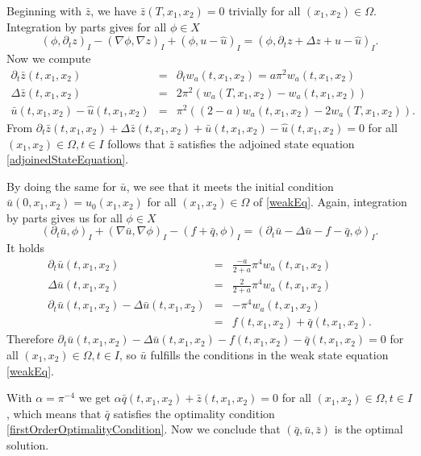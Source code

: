 Beginning with $\bar{z}$, we have $\bar{z}(T, x_1, x_2)=0$ trivially for all $(x_1,x_2)\in\Omega$. Integration by parts gives for all $\phi\in X$
\begin{displaymath}
(\phi,\partial_tz)_I-(\nabla \phi,\nabla z)_I+(\phi, u-\hat{u})_I=(\phi,\partial_tz+\Delta z+u-\hat{u})_I.
\end{displaymath}
Now we compute
\begin{eqnarray*}
\partial_t\bar{z}(t,x_1,x_2)&=&\partial_tw_a(t,x_1,x_2)=a\pi^2w_a(t,x_1,x_2)\\
\Delta \bar{z}(t,x_1,x_2)&=&2\pi^2(w_a(T,x_1,x_2)-w_a(t,x_1,x_2))\\
\bar{u}(t,x_1,x_2)-\hat{u}(t,x_1,x_2)&=&\pi^2((2-a)w_a(t,x_1,x_2)-2w_a(T,x_1,x_2)).
\end{eqnarray*}
From $\partial_t\bar{z}(t,x_1,x_2)+\Delta \bar{z}(t,x_1,x_2)+\bar{u}(t,x_1,x_2)-\hat{u}(t,x_1,x_2)=0$ for all $(x_1,x_2)\in\Omega, t\in I$ follows that $\bar{z}$ satisfies the adjoined state equation \eqref{adjoinedStateEquation}.

By doing the same for $\bar{u}$, we see that it meets the initial condition $\bar{u}(0,x_1,x_2)=u_0(x_1,x_2)$ for all $(x_1,x_2)\in\Omega$ of \eqref{weakEq}. Again, integration by parts gives us for all $\phi\in X$
\begin{displaymath}
(\partial_t\bar{u},\phi)_I+(\nabla \bar{u},\nabla\phi)_I-(f+\bar{q},\phi)_I=(\partial_t\bar{u}-\Delta\bar{u}-f-\bar{q},\phi)_I.
\end{displaymath}
It holds
\begin{eqnarray*}
\partial_t\bar{u}(t,x_1,x_2)&=&\frac{-a}{2+a}\pi^4w_a(t,x_1,x_2)\\
\Delta \bar{u}(t,x_1,x_2)&=&\frac{2}{2+a}\pi^4w_a(t,x_1,x_2)\\
\partial_t\bar{u}(t,x_1,x_2)-\Delta \bar{u}(t,x_1,x_2)&=&-\pi^4w_a(t,x_1,x_2)\\
&=&f(t,x_1,x_2)+\bar{q}(t,x_1,x_2).
\end{eqnarray*}
Therefore $\partial_t\bar{u}(t,x_1,x_2)-\Delta\bar{u}(t,x_1,x_2)-f(t,x_1,x_2)-\bar{q}(t,x_1,x_2)=0$ for all $(x_1,x_2)\in\Omega, t\in I$, so $\bar{u}$ fulfills the conditions in the weak state equation \eqref{weakEq}.

With $\alpha=\pi^{-4}$ we get $\alpha\bar{q}(t,x_1,x_2)+\bar{z}(t,x_1,x_2)=0$ for all $(x_1,x_2)\in\Omega, t\in I$, which means that $\bar{q}$ satisfies the optimality condition \eqref{firstOrderOptimalityCondition}. Now we conclude that $(\bar{q}, \bar{u}, \bar{z})$ is the optimal solution.\\

